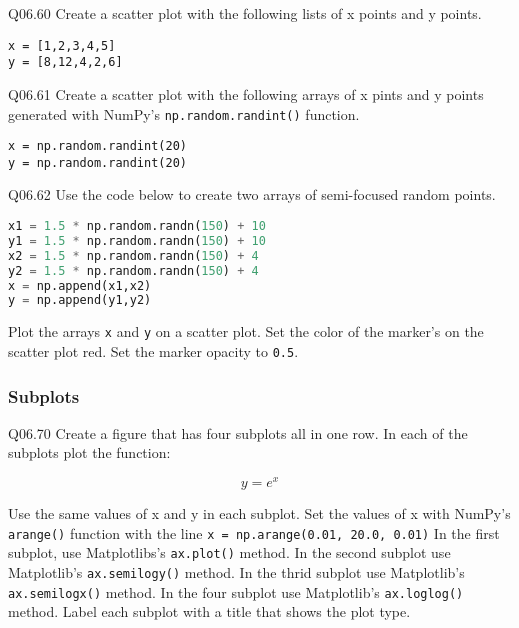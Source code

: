 \documentclass{book}
\newcommand{\passthrough}[1]{#1}
\begin{document}
Q06.60 Create a scatter plot with the following lists of x points and y
points.

\begin{lstlisting}
x = [1,2,3,4,5]
y = [8,12,4,2,6]
\end{lstlisting}

Q06.61 Create a scatter plot with the following arrays of x pints and y
points generated with NumPy's
\passthrough{\lstinline!np.random.randint()!} function.

\begin{lstlisting}
x = np.random.randint(20)
y = np.random.randint(20)
\end{lstlisting}

Q06.62 Use the code below to create two arrays of semi-focused random
points.

\begin{lstlisting}[language=Python]
x1 = 1.5 * np.random.randn(150) + 10
y1 = 1.5 * np.random.randn(150) + 10
x2 = 1.5 * np.random.randn(150) + 4
y2 = 1.5 * np.random.randn(150) + 4
x = np.append(x1,x2)
y = np.append(y1,y2)
\end{lstlisting}

Plot the arrays \passthrough{\lstinline!x!} and
\passthrough{\lstinline!y!} on a scatter plot. Set the color of the
marker's on the scatter plot red. Set the marker opacity to
\passthrough{\lstinline!0.5!}.
    




    
        \hypertarget{subplots}{%
\subsubsection{Subplots}\label{subplots}}

Q06.70 Create a figure that has four subplots all in one row. In each of
the subplots plot the function:

\[ y = e^x \]

Use the same values of x and y in each subplot. Set the values of x with
NumPy's \passthrough{\lstinline!arange()!} function with the line
\passthrough{\lstinline!x = np.arange(0.01, 20.0, 0.01)!} In the first
subplot, use Matplotlibs's \passthrough{\lstinline!ax.plot()!} method.
In the second subplot use Matplotlib's
\passthrough{\lstinline!ax.semilogy()!} method. In the thrid subplot use
Matplotlib's \passthrough{\lstinline!ax.semilogx()!} method. In the four
subplot use Matplotlib's \passthrough{\lstinline!ax.loglog()!} method.
Label each subplot with a title that shows the plot type.
    
\end{document}

